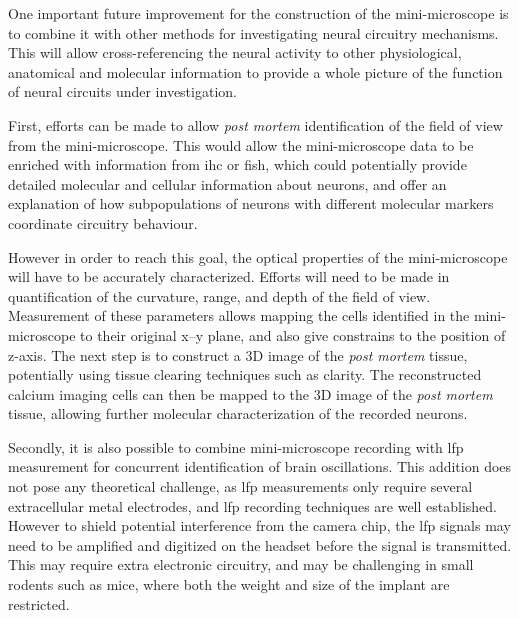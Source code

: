One important future improvement for the construction of the mini-microscope is to combine it with other methods for investigating neural circuitry mechanisms. This will allow cross-referencing the neural activity to other physiological, anatomical and molecular information to provide a whole picture of the function of neural circuits under investigation. 

First, efforts can be made to allow \textit{post mortem} identification of the field of view from the mini-microscope. This would allow the mini-microscope data to be enriched with information from \gls{ihc} or \gls{fish}, which could potentially provide detailed molecular and cellular information about neurons, and offer an explanation of how subpopulations of neurons with different molecular markers coordinate circuitry behaviour. 

However in order to reach this goal, the optical properties of the mini-microscope will have to be accurately characterized. Efforts will need to be made in quantification of the curvature, range, and depth of the field of view. Measurement of these parameters allows mapping the cells identified in the mini-microscope to their original x--y plane, and also give constrains to the position of z-axis. The next step is to construct a 3D image of the \textit{post mortem} tissue, potentially using tissue clearing techniques such as \gls{clarity}. The reconstructed calcium imaging cells can then be mapped to the 3D image of the \textit{post mortem} tissue, allowing further molecular characterization of the recorded neurons. 

Secondly, it is also possible to combine mini-microscope recording with \gls{lfp} measurement for concurrent identification of brain oscillations. This addition does not pose any theoretical challenge, as \gls{lfp} measurements only require several extracellular metal electrodes, and \gls{lfp} recording techniques are well established. However to shield potential interference from the camera chip, the \gls{lfp} signals may need to be amplified and digitized on the headset before the signal is transmitted. This may require extra electronic circuitry, and may be challenging in small rodents such as mice, where both the weight and size of the implant are restricted. 

